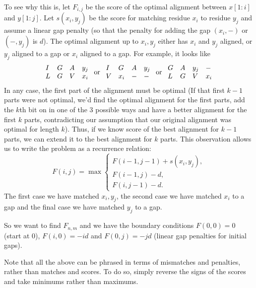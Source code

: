 \documentclass[11pt]{article}
\begin{document}
To see why this is, let  $F_{i,j}$ be the score of the optimal alignment between $x[1 : i]$ and $y[1 : j]$.  Let  $s(x_i,y_j)$ be the score for matching residue $x_i$ to residue $y_j$ and assume a linear gap penalty (so that the penalty for adding the gap $(x_i, -)$ or $(-,y_j)$ is $d$).  The optimal alignment up to $x_i,y_j$ either has $x_i$ and $y_j$ aligned, or $y_j$ aligned to a gap or $x_i$ aligned to a gap.  For example, it looks like
\[
\mathtt{\begin{array}{ll l l }
I & G & A & y_j \\
L &G &V & x_i
\end{array}} \mbox{ or }
\mathtt{\begin{array}{ll l l }
I & G & A & y_j \\
V& x_i & - & - 
\end{array}} \mbox{ or }
\mathtt{\begin{array}{ll l l }
G & A & y_j & -\\
L &G &V & x_i
\end{array}}
\]
In any case, the first part of the alignment must be optimal (If that first $k-1$ parts were not optimal, we'd find the optimal alignment for the first parts, add the $k$th bit on in one of the 3 possible ways and have a better alignment for the first $k$ parts, contradicting our assumption that our original alignment was optimal for length $k$).    Thus, if we know score of the best alignment for $k-1$ parts, we can extend it to the best alignment for $k$ parts.  This observation allows us to write the problem as a recurrence relation:
\[ F(i,j)= \max 
\begin{cases}
F(i-1,j-1)+s(x_i,y_j), \\
F(i-1,j)-d, \\
F(i,j-1)-d.
\end{cases} \]
The first case we have matched $x_i,y_j$, the second case we have matched $x_i$ to a gap and the final case we have matched $y_j$ to a gap.

So we want to find $F_{n,m}$ and we have the boundary conditions $F(0, 0) = 0$ (start at 0), $F (i, 0) = -id$ and $F (0, j) = -jd$ (linear gap penalties for initial gaps).

Note that all the above can be phrased in terms of mismatches and penalties, rather than matches and scores. To do so, simply reverse the signs of the scores and take minimums rather than maximums.
\end{document}
